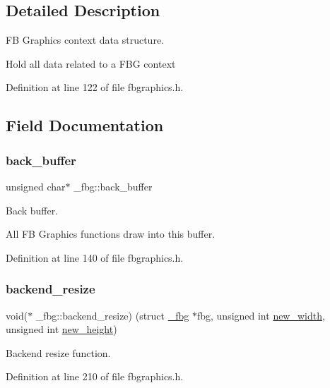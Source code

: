 \subsection{Detailed Description}
FB Graphics context data structure. 

Hold all data related to a F\+BG context 

Definition at line 122 of file fbgraphics.\+h.



\subsection{Field Documentation}
\mbox{\label{struct__fbg_a907e7fc97965b972c17114c885e53735}} 
\subsubsection{\texorpdfstring{back\+\_\+buffer}{back\_buffer}}
{\footnotesize\ttfamily unsigned char$\ast$ \+\_\+fbg\+::back\+\_\+buffer}



Back buffer. 

All FB Graphics functions draw into this buffer. 

Definition at line 140 of file fbgraphics.\+h.

\mbox{\label{struct__fbg_aef07a92ae059ea2a43653f4d0c5d928e}} 
\subsubsection{\texorpdfstring{backend\+\_\+resize}{backend\_resize}}
{\footnotesize\ttfamily void($\ast$ \+\_\+fbg\+::backend\+\_\+resize) (struct \mbox{\hyperlink{struct__fbg}{\+\_\+fbg}} $\ast$fbg, unsigned int \mbox{\hyperlink{struct__fbg_a95859bd418a5cfff155cdb1421d295ef}{new\+\_\+width}}, unsigned int \mbox{\hyperlink{struct__fbg_a509aa5f8f0a94d8313bb4da777aa64bc}{new\+\_\+height}})}



Backend resize function. 



Definition at line 210 of file fbgraphics.\+h.

